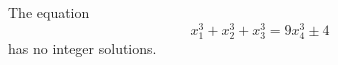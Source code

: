 \begin{proposition}
    The equation
\[
    x_1^3+x_2^3+x_3^3=9x_4^3\pm4
\]
    has no integer solutions.
\end{proposition}
